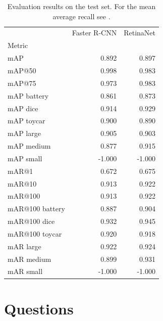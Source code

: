 \documentclass{article}
\begin{document}
\begin{table}[h]
    \centering
    \begin{tabular}{lrr}
        \toprule
                        & Faster R-CNN & RetinaNet \\
        Metric          &              &           \\
        \midrule
        mAP             & 0.892        & 0.897     \\
        mAP@50          & 0.998        & 0.983     \\
        mAP@75          & 0.973        & 0.983     \\
        mAP battery     & 0.861        & 0.873     \\
        mAP dice        & 0.914        & 0.929     \\
        mAP toycar      & 0.900        & 0.890     \\
        mAP large       & 0.905        & 0.903     \\
        mAP medium      & 0.877        & 0.915     \\
        mAP small       & -1.000       & -1.000    \\
        mAR@1           & 0.672        & 0.675     \\
        mAR@10          & 0.913        & 0.922     \\
        mAR@100         & 0.913        & 0.922     \\
        mAR@100 battery & 0.887        & 0.904     \\
        mAR@100 dice    & 0.932        & 0.945     \\
        mAR@100 toycar  & 0.920        & 0.918     \\
        mAR large       & 0.922        & 0.924     \\
        mAR medium      & 0.899        & 0.931     \\
        mAR small       & -1.000       & -1.000    \\
        \bottomrule
    \end{tabular}
    \caption{Evaluation results on the test set. For the mean average recall see \cite{mar}.}
    \label{table:test_map}
\end{table}

\section{Questions}
\end{document}
